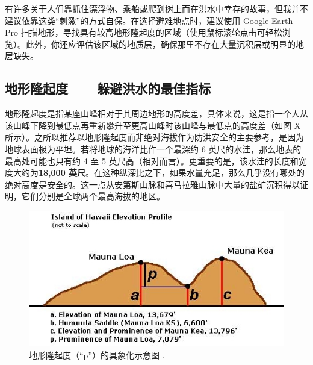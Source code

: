 \documentclass[10pt,twocolumn,letterpaper]{article}
\begin{document}
有许多关于人们靠抓住漂浮物、乘船或爬到树上而在洪水中幸存的故事，但我并不建议依靠这类“刺激”的方式自保。在选择避难地点时，建议使用 Google Earth Pro 扫描地形，寻找具有较高地形隆起度的区域（使用鼠标滚轮点击可轻松浏览）。此外，你还应评估该区域的地质层，确保那里不存在大量沉积层或明显的地层缺失。
\subsection{地形隆起度——躲避洪水的最佳指标}

地形隆起度是指某座山峰相对于其周边地形的高度差，具体来说，这是指一个人从该山峰下降到最低点再重新攀升至更高山峰时该山峰与最低点的高度差（如图 X 所示）。之所以推荐以地形隆起度而非绝对海拔作为防洪安全的主要参考，是因为地球表面极为平坦。若将地球的海洋比作一个最深约 6 英尺的水洼，那么地表的最高处可能也只有约 4 至 5 英尺高（相对而言）。更重要的是，该水洼的长度和宽度大约为\textbf{18,000 英尺}。在这种纵深比之下，如果水量充足，那么几乎没有哪处的绝对高度是安全的。这一点从安第斯山脉和喜马拉雅山脉中大量的盐矿沉积得以证明，它们分别是全球两个最高海拔的地区。

\begin{figure}[t]
\begin{center}
   \includegraphics[width=1\linewidth]{prominence.jpeg}
\end{center}
   \caption{地形隆起度（“p”）的具象化示意图 \cite{53}.}
\label{fig:11}
\label{fig:onecol}
\end{figure}
\end{document}

